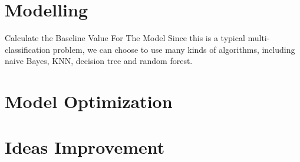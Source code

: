 \documentclass[
 size=14pt,
 paper=smartboard,  %
 mode=present, 		%
 display=slides, 	%
 style=tuliplab,  	%
 pauseslide,
 fleqn,leqno]{powerdot}
\begin{document}

\section{Modelling}


\begin{slide}{Calculate the Baseline Value For The Model}
  Since this is a typical multi-classification problem, we 
  can choose to use many kinds of algorithms, including naive
   Bayes, KNN, decision tree and random forest.
\end{slide}



\section{Model Optimization}



\section{Ideas Improvement}

\end{document}
